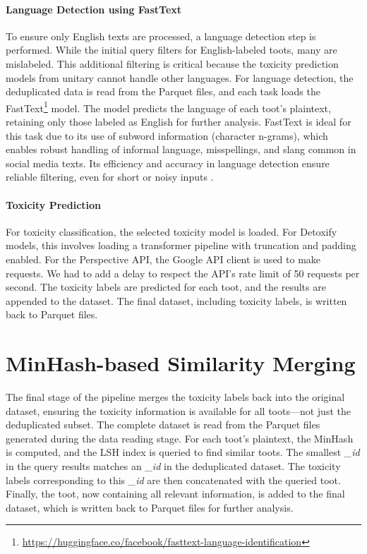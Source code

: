 \paragraph{Language Detection using FastText}
To ensure only English texts are processed, a language detection step is performed. While the initial query filters for English-labeled toots, many are mislabeled. This additional filtering is critical because the toxicity prediction models from unitary cannot handle other languages.
For language detection, the deduplicated data is read from the Parquet files, and each task loads the FastText\footnote{\url{https://huggingface.co/facebook/fasttext-language-identification}} model. The model predicts the language of each toot’s plaintext, retaining only those labeled as English for further analysis.
FastText is ideal for this task due to its use of subword information (character n-grams), which enables robust handling of informal language, misspellings, and slang common in social media texts. Its efficiency and accuracy in language detection ensure reliable filtering, even for short or noisy inputs \cite{joulin:2016}.

\paragraph{Toxicity Prediction}
For toxicity classification, the selected toxicity model is loaded. For Detoxify models, this involves loading a transformer pipeline with truncation and padding enabled. For the Perspective API, the Google API client is used to make requests. We had to add a delay to respect the API's rate limit of 50 requests per second. The toxicity labels are predicted for each toot, and the results are appended to the dataset. The final dataset, including toxicity labels, is written back to Parquet files.

\section{MinHash-based Similarity Merging}\label{step:merge}
The final stage of the pipeline merges the toxicity labels back into the original dataset, ensuring the toxicity information is available for all toots—not just the deduplicated subset. The complete dataset is read from the Parquet files generated during the data reading stage. For each toot’s plaintext, the MinHash is computed, and the LSH index is queried to find similar toots. The smallest \textit{\_id} in the query results matches an \textit{\_id} in the deduplicated dataset. The toxicity labels corresponding to this \textit{\_id} are then concatenated with the queried toot. Finally, the toot, now containing all relevant information, is added to the final dataset, which is written back to Parquet files for further analysis.